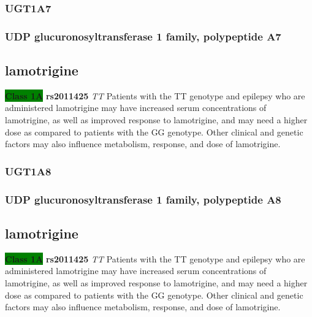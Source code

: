 \documentclass{book}
\begin{document}
\subsubsection{ UGT1A7 }
\subsubsection{ UDP glucuronosyltransferase 1 family, polypeptide A7 }

\subsection{ lamotrigine }


\begin{center}



\textbf{\colorbox{green} {Class 1A}} \textbf{ rs2011425 } \textit{ TT }
Patients with the TT genotype and epilepsy who are administered lamotrigine may have increased serum concentrations of lamotrigine, as well as improved response to lamotrigine, and may need a higher dose as compared to patients with the GG genotype. Other clinical and genetic factors may also influence metabolism, response, and dose of lamotrigine.  

\end{center}






\subsubsection{ UGT1A8 }
\subsubsection{ UDP glucuronosyltransferase 1 family, polypeptide A8 }

\subsection{ lamotrigine }


\begin{center}



\textbf{\colorbox{green} {Class 1A}} \textbf{ rs2011425 } \textit{ TT }
Patients with the TT genotype and epilepsy who are administered lamotrigine may have increased serum concentrations of lamotrigine, as well as improved response to lamotrigine, and may need a higher dose as compared to patients with the GG genotype. Other clinical and genetic factors may also influence metabolism, response, and dose of lamotrigine.  

\end{center}
\end{document}
